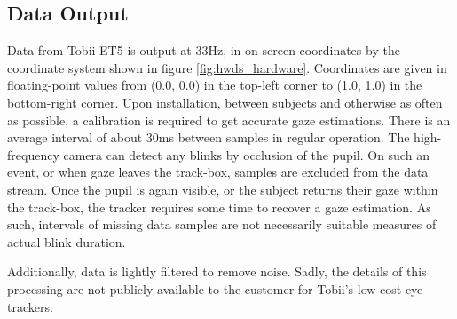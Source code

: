 \subsection{Data Output}

Data from Tobii ET5 is output at 33Hz, in on-screen coordinates by the coordinate system shown in figure \ref{fig:hwds_hardware}. Coordinates are given in floating-point values from (0.0, 0.0) in the top-left corner to (1.0, 1.0) in the bottom-right corner. Upon installation, between subjects and otherwise as often as possible, a calibration is required to get accurate gaze estimations. There is an average interval of about 30ms between samples in regular operation. The high-frequency camera can detect any blinks by occlusion of the pupil. On such an event, or when gaze leaves the track-box, samples are excluded from the data stream. Once the pupil is again visible, or the subject returns their gaze within the track-box, the tracker requires some time to recover a gaze estimation. As such, intervals of missing data samples are not necessarily suitable measures of actual blink duration.

Additionally, data is lightly filtered to remove noise. Sadly, the details of this processing are not publicly available to the customer for Tobii's low-cost eye trackers. 
